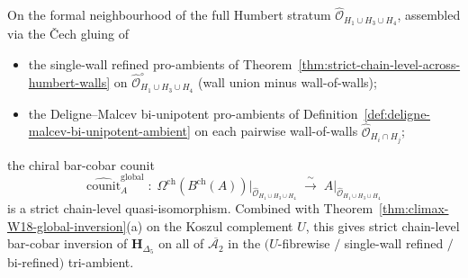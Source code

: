 \begin{corollary}
\label{cor:global-strict-bar-cobar-humbert-stratum}
\ClaimStatusConditional
{}%
On the formal neighbourhood of the full Humbert stratum
$\widehat{\mathcal{O}}_{H_1\cup H_3\cup H_4}$, assembled via the
\v{C}ech gluing of
\begin{itemize}
\item the single-wall refined pro-ambients of
Theorem~\textup{\ref{thm:strict-chain-level-across-humbert-walls}} on
$\widehat{\mathcal{O}}^{\circ}_{H_1\cup H_3\cup H_4}$ (wall union
minus wall-of-walls);
\item the Deligne--Malcev bi-unipotent pro-ambients of
Definition~\textup{\ref{def:deligne-malcev-bi-unipotent-ambient}} on
each pairwise wall-of-walls
$\widehat{\mathcal{O}}_{H_i\cap H_j}$;
\end{itemize}
the chiral bar-cobar counit
\[
\widehat{\mathrm{counit}}^{\mathrm{global}}_A
\;\colon\;
\Omega^{\mathrm{ch}}(B^{\mathrm{ch}}(A))
\big|_{\widehat{\mathcal{O}}_{H_1\cup H_3\cup H_4}}
\;\xrightarrow{\;\sim\;}\;
A\big|_{\widehat{\mathcal{O}}_{H_1\cup H_3\cup H_4}}
\]
is a strict chain-level quasi-isomorphism. Combined with
Theorem~\textup{\ref{thm:climax-W18-global-inversion}}(a) on the
Koszul complement $U$, this gives strict chain-level bar-cobar
inversion of $\mathbf{H}_{\Delta_5}$ on all of
$\overline{\mathcal{A}_2}$ in the $(U$-fibrewise $/$ single-wall
refined $/$ bi-refined$)$ tri-ambient.
\end{corollary}

